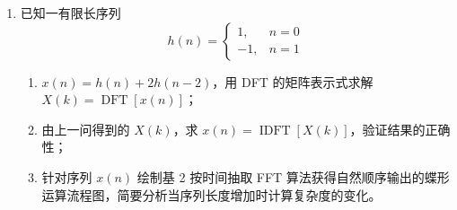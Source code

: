 \begin{enumerate}
\begin{enumerate}
    \item 线性卷积：长度为 $4+4-1=7$。
    \[
    \begin{aligned}
    y_l(0) &= x(0)x(0) = 0.25 \\
    y_l(1) &= x(0)x(1)+x(1)x(0) = 1 \\
    y_l(2) &= x(0)x(2)+x(1)x(1)+x(2)x(0) = 2 \\
    y_l(3) &= x(0)x(3)+x(1)x(2)+x(2)x(1)+x(3)x(0) = 3 \\
    y_l(4) &= x(1)x(3)+x(2)x(2)+x(3)x(1) = 2 \\
    y_l(5) &= x(2)x(3)+x(3)x(2) = 1 \\
    y_l(6) &= x(3)x(3) = 0.25
    \end{aligned}
    \]
    \[
    y_l(n) = \{0.25,\ 1,\ 2,\ 3,\ 2,\ 1,\ 0.25\}
    \]

    \item 4 点圆卷积：
    \[
    y_c(n) = \left(\sum_{m=0}^{3}x(m)x((n-m))_4\right)R_4(n)
    \]
    计算得：
    \[
    y_c(0)=2.5,\ y_c(1)=2,\ y_c(2)=2.5,\ y_c(3)=3
    \]

    \item 11 点圆卷积：
    因为 $L=11\ge 7$，故 11 点圆卷积与线性卷积相同：
    \[
    y_{11}(n) = \{0.25,\ 1,\ 2,\ 3,\ 2,\ 1,\ 0.25,\ 0,\ 0,\ 0,\ 0\}
    \]

    \item 圆卷积与线性卷积相同的条件是 $L\ge N_1+N_2-1=4+4-1=7$，故最小长度 $L_{\min}=7$。
\end{enumerate}

\vspace{1em}

\item 已知一有限长序列
\[
h(n) =
\begin{cases}
1, & n=0 \\
-1, & n=1
\end{cases}
\]
\begin{enumerate}
    \item $x(n)=h(n)+2h(n-2)$，用 DFT 的矩阵表示式求解 $X(k)=\operatorname{DFT}[x(n)]$；
    \item 由上一问得到的 $X(k)$，求 $x(n)=\operatorname{IDFT}[X(k)]$，验证结果的正确性；
    \item 针对序列 $x(n)$ 绘制基 2 按时间抽取 FFT 算法获得自然顺序输出的蝶形运算流程图，简要分析当序列长度增加时计算复杂度的变化。
\end{enumerate}


\end{enumerate}
